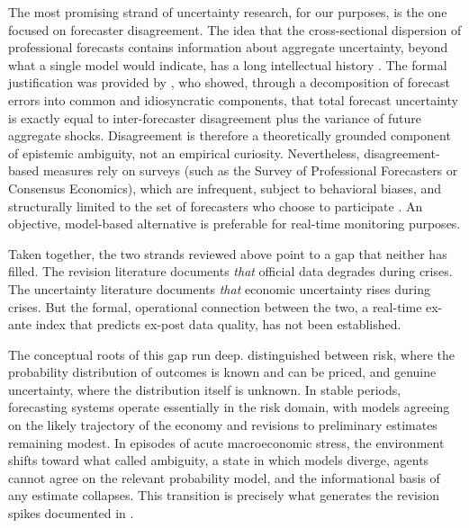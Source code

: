 \documentclass[12pt,a4paper]{article}
\theoremstyle{remark}
\begin{document}
The most promising strand of uncertainty research, for our purposes, is the one focused on forecaster disagreement. The idea that the cross-sectional dispersion of professional forecasts contains information about aggregate uncertainty, beyond what a single model would indicate, has a long intellectual history \citep{mankiw2004}. The formal justification was provided by \citet{lahiri2010}, who showed, through a decomposition of forecast errors into common and idiosyncratic components, that total forecast uncertainty is exactly equal to inter-forecaster disagreement plus the variance of future aggregate shocks. Disagreement is therefore a theoretically grounded component of epistemic ambiguity, not an empirical curiosity. Nevertheless, disagreement-based measures rely on surveys (such as the Survey of Professional Forecasters or Consensus Economics), which are infrequent, subject to behavioral biases, and structurally limited to the set of forecasters who choose to participate \citep{clark2017, carriero2018}. An objective, model-based alternative is preferable for real-time monitoring purposes.

Taken together, the two strands reviewed above point to a gap that neither has filled. The revision literature documents \textit{that} official data degrades during crises. The uncertainty literature documents \textit{that} economic uncertainty rises during crises. But the formal, operational connection between the two, a real-time ex-ante index that predicts ex-post data quality, has not been established.

The conceptual roots of this gap run deep. \citet{knight1921} distinguished between risk, where the probability distribution of outcomes is known and can be priced, and genuine uncertainty, where the distribution itself is unknown. In stable periods, forecasting systems operate essentially in the risk domain, with models agreeing on the likely trajectory of the economy and revisions to preliminary estimates remaining modest. In episodes of acute macroeconomic stress, the environment shifts toward what \citet{ellsberg1961} called ambiguity, a state in which models diverge, agents cannot agree on the relevant probability model, and the informational basis of any estimate collapses. This transition is precisely what generates the revision spikes documented in .
\end{document}

